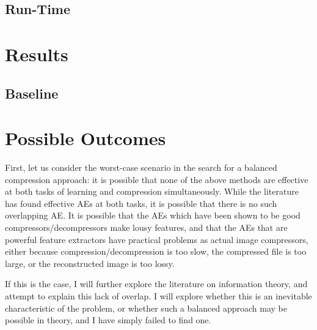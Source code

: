 \documentclass[twoside,11pt]{article}
\begin{document}
\subsection{Run-Time}




\section{Results} \label{results}


\subsection{Baseline}










\section{Possible Outcomes}

First, let us consider the worst-case scenario in the search for a balanced 
compression approach: it is possible that none of the above methods are 
effective at both tasks of learning and compression simultaneously. 
While the literature has found effective AEs at both tasks, it is possible that 
there is no such overlapping AE. 
It is possible that the AEs which have been shown to be good 
compressors/decompressors make lousy features, and that the AEs that are 
powerful feature extractors have practical problems as actual image 
compressors, either because compression/decompression is too slow, the 
compressed file is too large, or the reconstructed image is too lossy. 

If this is the case, I will further explore the literature on information theory, 
and attempt to explain this lack of overlap. I will explore whether this is 
an inevitable characteristic of the problem, 
or whether such a balanced approach may be possible in theory, and I have
simply failed to find one. 
\end{document}
